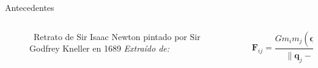 \begin{frame}{Antecedentes}
    \vspace{-0.15cm}
    \begin{columns}
        \begin{column}{0.4\textwidth}
            \centering
            \begin{figure}[H]
                \centering
                \vspace{-0.25cm}
                \caption{\tiny~Retrato de Sir Isaac Newton pintado por Sir Godfrey Kneller en 1689 \textit{Extraído de:}~\cite{cambridge_newton_kneller_2016}}%
                \label{fig:Isaac_Newton_Portrait}
            \end{figure}
        \end{column}
        \begin{column}{0.6\textwidth}
            \[\mathbf{F}_{ij} = \frac{Gm_i m_j (\mathbf{q}_j - \mathbf{q}_i)}{\|\mathbf{q}_j - \mathbf{q}_i\|^3},\]

\end{column}
\end{columns}
\end{frame}
